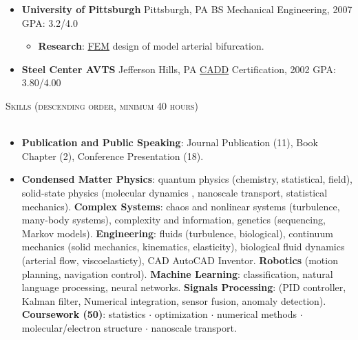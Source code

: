 \documentclass{article}
\newcommand{\lineunder}{\vspace*{-8pt} \\ \hspace*{-18pt} \hrulefill \\}
\newcommand{\header}[1]{{\hspace*{-15pt}\vspace*{6pt} \textsc{#1}} \vspace*{-6pt} \lineunder}
\newenvironment{achievements}{\begin{list}{$\bullet$}{\topsep 0pt \itemsep -2pt}}{\vspace*{4pt}\end{list}}
\begin{document}
\begin{itemize}
\begin{itemize}[leftmargin=*]
  \item \textbf{University of Pittsburgh} Pittsburgh, PA BS Mechanical Engineering, 2007 GPA: 3.2/4.0
  \begin{itemize}
    \item \textbf{Research}: \href{http://en.wikipedia.org/wiki/Finite_element_method}{FEM} design of model arterial bifurcation.
  \end{itemize}

  \item \textbf{Steel Center AVTS} Jefferson Hills, PA \href{http://en.wikipedia.org/wiki/Computer-aided_design}{CADD} Certification, 2002 GPA: 3.80/4.00

\end{itemize}

\header{\Large{Skills (descending order, minimum 40 hours)}}


\begin{itemize}[leftmargin=*]

  \item \textbf{Publication and Public Speaking}: Journal Publication (11), Book Chapter (2), Conference Presentation (18).

  \item \textbf{Condensed Matter Physics}: quantum physics (chemistry, statistical, field), solid-state physics (molecular dynamics , nanoscale transport, statistical mechanics). \textbf{Complex Systems}: chaos and nonlinear systems (turbulence, many-body systems), complexity and information, genetics (sequencing, Markov models). \textbf{Engineering}: fluids (turbulence,  biological), continuum mechanics (solid mechanics, kinematics, elasticity), biological fluid dynamics (arterial flow, viscoelasticty), CAD AutoCAD Inventor. \textbf{Robotics} (motion planning, navigation control). \textbf{Machine Learning}: classification, natural language processing, neural networks. \textbf{Signals Processing}: (PID controller, Kalman filter, Numerical integration, sensor fusion, anomaly detection). \textbf{Coursework (50)}: statistics $\cdot$ optimization $\cdot$ numerical methods $\cdot$ molecular/electron structure $\cdot$ nanoscale transport. 


\end{itemize}
\end{itemize}
\end{document}
